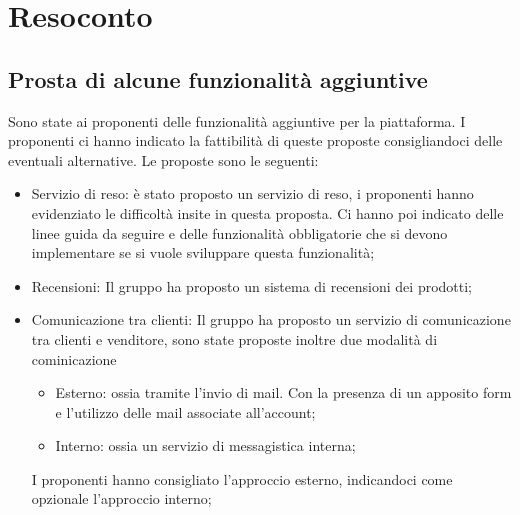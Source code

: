 \documentclass[a4paper]{article}
\begin{document}
    \section{Resoconto}
    
        \subsection{Prosta di alcune funzionalità aggiuntive}
        Sono state  ai proponenti delle funzionalità aggiuntive per la piattaforma. I proponenti ci hanno indicato la fattibilità di queste proposte consigliandoci delle eventuali alternative.
        Le proposte sono le seguenti:
        \begin{itemize}
            \item Servizio di reso: è stato proposto un servizio di reso, i proponenti hanno evidenziato le difficoltà insite in questa proposta. Ci hanno poi indicato delle linee guida da seguire e delle funzionalità obbligatorie che si devono implementare se si vuole sviluppare questa funzionalità;
            \item Recensioni: Il gruppo ha proposto un sistema di recensioni dei prodotti;
            \item Comunicazione tra clienti: Il gruppo ha proposto un servizio di comunicazione tra clienti e venditore, sono state proposte inoltre due modalità di cominicazione
            \begin{itemize}
                \item Esterno: ossia tramite l'invio di mail. Con la presenza di un apposito form e l'utilizzo delle mail associate all'account;
                \item Interno: ossia un servizio di messagistica interna;  
            \end{itemize}
            I proponenti hanno consigliato l'approccio esterno, indicandoci come opzionale l'approccio interno;
        \end{itemize}
        
\end{document}
